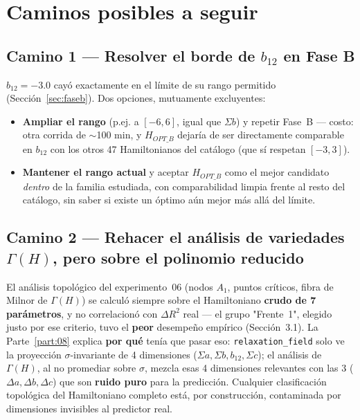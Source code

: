 \documentclass[11pt, a4paper]{article}
\begin{document}
\section{Caminos posibles a seguir}
\label{sec:caminos}

\subsection{Camino 1 --- Resolver el borde de $b_{12}$ en Fase B}

$b_{12}=-3.0$ cay\'o exactamente en el l\'imite de su rango permitido
(Secci\'on~\ref{sec:faseb}). Dos opciones, mutuamente excluyentes:

\begin{itemize}
  \item \textbf{Ampliar el rango} (p.ej. a $[-6,6]$, igual que
        $\Sigma b$) y repetir Fase~B --- costo: otra corrida de
        $\sim$100 min, y $H_{OPT\_B}$ dejar\'ia de ser directamente
        comparable en $b_{12}$ con los otros 47 Hamiltonianos del
        cat\'alogo (que s\'i respetan $[-3,3]$).
  \item \textbf{Mantener el rango actual} y aceptar $H_{OPT\_B}$ como
        el mejor candidato \emph{dentro} de la familia estudiada, con
        comparabilidad limpia frente al resto del cat\'alogo, sin saber
        si existe un \'optimo a\'un mejor m\'as all\'a del l\'imite.
\end{itemize}

\subsection{Camino 2 --- Rehacer el an\'alisis de variedades $\Gamma(H)$, pero sobre el polinomio reducido}
\label{sec:camino-variedades}

El an\'alisis topol\'ogico del experimento~06 (nodos $A_1$, puntos
cr\'iticos, fibra de Milnor de $\Gamma(H)$) se calcul\'o siempre sobre
el Hamiltoniano \textbf{crudo de 7 par\'ametros}, y no correlacion\'o
con $\Delta R^2$ real --- el grupo "Frente~1", elegido justo por ese
criterio, tuvo el \textbf{peor} desempe\~no emp\'irico
(Secci\'on~3.1). La Parte~\ref{part:08} explica \textbf{por qu\'e} ten\'ia
que pasar eso: \texttt{relaxation\_field} solo ve la proyecci\'on
$\sigma$-invariante de 4 dimensiones ($\Sigma a,\Sigma b,b_{12},\Sigma c$);
el an\'alisis de $\Gamma(H)$, al no promediar sobre $\sigma$, mezcla esas
4 dimensiones relevantes con las 3 ($\Delta a,\Delta b,\Delta c$) que son
\textbf{ruido puro} para la predicci\'on. Cualquier clasificaci\'on
topol\'ogica del Hamiltoniano completo est\'a, por construcci\'on,
contaminada por dimensiones invisibles al predictor real.
\end{document}
